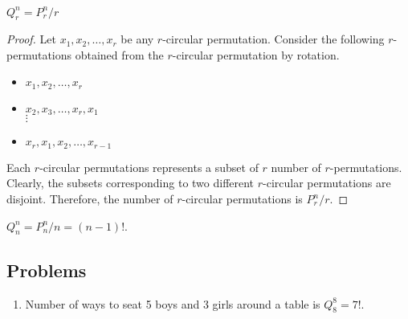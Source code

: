 \begin{theorem}
	$Q^n_r = P^n_r/r$
\end{theorem}
\begin{proof}
	Let $x_1,x_2,\dots,x_r$ be any $r$-circular permutation. Consider the following $r$-permutations obtained from the $r$-circular permutation by rotation.
\begin{itemize}
	\item $x_1,x_2,\dots,x_r$ 
	\item $x_2,x_3,\dots,x_r,x_1$\\ $\vdots$ 
	\item $x_r,x_1,x_2,\dots,x_{r-1}$ 
\end{itemize}

	Each $r$-circular permutations represents a subset of $r$ number of $r$-permutations.
	Clearly, the subsets corresponding to two different $r$-circular permutations are disjoint.
	Therefore, the number of $r$-circular permutations is $P^n_r/r$.	
\end{proof}
\begin{remark}
	$Q^n_n = P^n_n / n = (n-1)!$.
\end{remark}

\subsection*{Problems}
\begin{enumerate}
	\item Number of ways to seat 5 boys and 3 girls around a table is $Q^8_8 = 7!$.
\end{enumerate}

